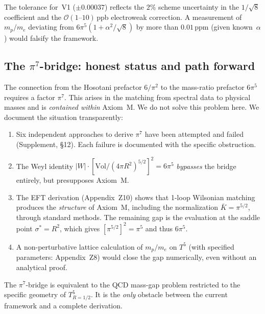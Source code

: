 \noindent
The tolerance for~V1 ($\pm 0.00037$) reflects the $2\%$ scheme
uncertainty in the $1/\!\sqrt{8}$ coefficient and the
$\mathcal{O}(1\text{--}10)\,$ppb electroweak correction.
A measurement of $m_p/m_e$ deviating from $6\pi^5(1+\alpha^2/\!\sqrt{8})$
by more than $0.01\,$ppm (given known~$\alpha$) would falsify the
framework.

\subsection{The $\pi^7$-bridge: honest status and path forward}
\label{sec:pi7honest}

The connection from the Hosotani prefactor $6/\pi^2$ to the mass-ratio
prefactor $6\pi^5$ requires a factor $\pi^7$. This arises in the
matching from spectral data to physical masses and is \emph{contained
within} Axiom~M. We do not solve this problem here. We document the
situation transparently:

\begin{enumerate}[nosep]
\item Six independent approaches to derive $\pi^7$ have been attempted
  and failed (Supplement, \S12). Each failure is documented with the
  specific obstruction.
\item The Weyl identity $|W|\cdot[\mathrm{Vol}/(4\pi R^2)^{5/2}]^2=6\pi^5$
  \emph{bypasses} the bridge entirely, but presupposes Axiom~M.
\item The EFT derivation (Appendix~Z10) shows that 1-loop Wilsonian
  matching produces the \emph{structure} of Axiom~M, including the
  normalization $\bar K=\pi^{5/2}$, through standard methods. The
  remaining gap is the evaluation at the saddle point $\sigma^*=R^2$,
  which gives $[\pi^{5/2}]^2=\pi^5$ and thus $6\pi^5$.
\item A non-perturbative lattice calculation of $m_p/m_e$ on $T^5$
  (with specified parameters: Appendix~Z8) would close the gap
  numerically, even without an analytical proof.
\end{enumerate}

The $\pi^7$-bridge is equivalent to the QCD mass-gap problem restricted
to the specific geometry of $T^5_{R=1/2}$. It is the
\emph{only} obstacle between the current framework and a complete
derivation.
